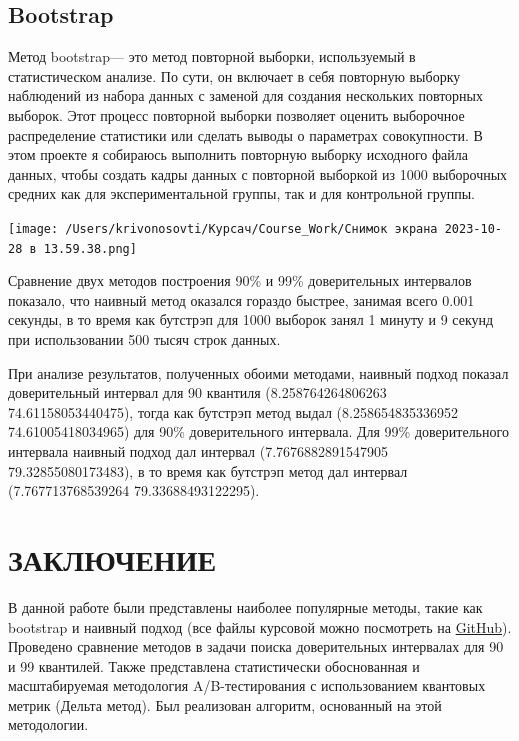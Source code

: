 \documentclass[specialist,
               substylefile = spbu_report.rtx,
               subf,href,colorlinks=true, 12pt]{disser}
\begin{document}
    \subsection{Bootstrap}

    Метод bootstrap— это метод повторной выборки, используемый в статистическом анализе. По сути, он включает в себя повторную выборку наблюдений из набора данных с заменой для создания нескольких повторных выборок. Этот процесс повторной выборки позволяет оценить выборочное распределение статистики или сделать выводы о параметрах совокупности. В этом проекте я собираюсь выполнить повторную выборку исходного файла данных, чтобы создать кадры данных с повторной выборкой из 1000 выборочных средних как для экспериментальной группы, так и для контрольной группы.


    \texttt{[image: /Users/krivonosovti/Курсач/Course\_Work/Снимок экрана 2023-10-28 в 13.59.38.png]}
    

    Сравнение двух методов построения 90\% и 99\% доверительных интервалов показало, что наивный метод оказался гораздо быстрее, занимая всего 0.001 секунды, в то время как бутстрэп  для 1000 выборок занял 1 минуту и 9 секунд при использовании 500 тысяч строк данных.
    
    При анализе результатов, полученных обоими методами, наивный подход показал доверительный интервал для 90 квантиля (8.258764264806263 74.61158053440475), тогда как бутстрэп  метод выдал (8.258654835336952 74.61005418034965) для 90\% доверительного интервала. Для 99\% доверительного интервала наивный подход дал интервал (7.7676882891547905 79.32855080173483), в то время как бутстрэп  метод дал интервал (7.767713768539264 79.33688493122295).
    

   

\newpage
\section {ЗАКЛЮЧЕНИЕ}
В данной работе были представлены наиболее популярные методы, такие как bootstrap и наивный подход (все файлы курсовой можно посмотреть на \href{https://github.com/krivonosovti/QuantileCIComparison}{GitHub}). Проведено сравнение методов в задачи поиска доверительных интервалах для 90 и 99 квантилей. Также представлена статистически обоснованная и масштабируемая методология A/B-тестирования с использованием квантовых метрик (Дельта метод). Был реализован  алгоритм, основанный на этой методологии.
\end{document}
